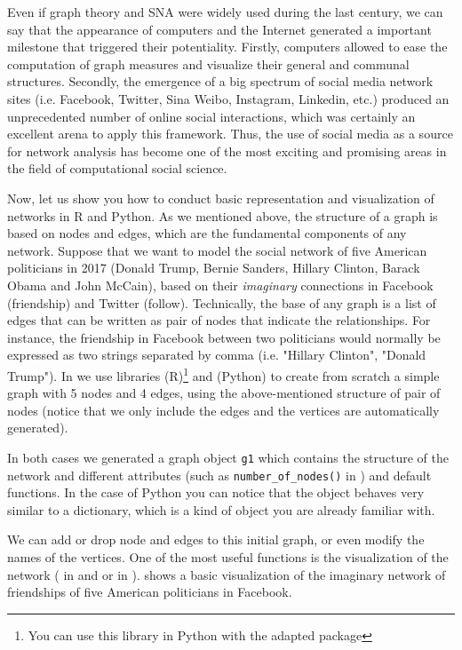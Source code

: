 Even if graph theory and SNA were widely used during the last century, we can say that the appearance of computers and the Internet generated a important milestone that triggered their potentiality. Firstly, computers allowed to ease the computation of graph measures and visualize their general and communal structures. Secondly, the emergence of a big spectrum of social media network sites (i.e. Facebook, Twitter, Sina Weibo, Instagram, Linkedin, etc.) produced an unprecedented number of online social interactions, which was certainly an excellent arena to apply this framework. Thus, the use of social media as a source for network analysis has become one of the most exciting and promising areas in the field of computational social science.

Now, let us show you how to conduct basic representation and visualization of networks in R and Python. As we mentioned above, the structure of a graph is based on nodes and edges, which are the fundamental components of any network. Suppose that we want to model the social network of five American politicians in 2017 (Donald Trump, Bernie Sanders, Hillary Clinton, Barack Obama and John McCain), based on their \textit{imaginary} connections in Facebook (friendship) and Twitter (follow). Technically, the base of any graph is a list of edges that can be written as pair of nodes that indicate the relationships.  For instance, the friendship in Facebook between two politicians would normally be expressed as two strings separated by comma (i.e. "Hillary Clinton", "Donald Trump"). In  we use libraries  (R)\footnote{You can use this library in Python with the adapted package }  and  (Python) to create from scratch a simple graph with 5 nodes and 4 edges, using the above-mentioned structure of pair of nodes (notice that we only include the edges and the vertices are automatically generated).


In both cases we generated a graph object \texttt{g1} which contains the structure of the network and different attributes (such as \verb|number_of_nodes()| in 	) and default functions. In the case of Python you can notice that the  object behaves very similar to a dictionary, which is a kind of object you are already familiar with.

We can add or drop node and edges to this initial graph, or even modify the names of the vertices. One of the most useful functions is the visualization of the network ( in  and  or  in ).  shows a basic visualization of the imaginary network of friendships of five American politicians in Facebook.


